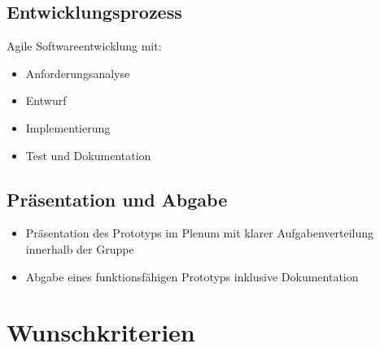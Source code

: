 \documentclass[%
	ngerman,
	12pt,
	a4paper,
	oneside
]{scrbook}
\begin{document}
	\subsection{Entwicklungsprozess}
	Agile Softwareentwicklung mit:
	\begin{itemize}
		\item Anforderungsanalyse
		\item Entwurf
		\item Implementierung
		\item Test und Dokumentation
	\end{itemize}
	\subsection{Präsentation und Abgabe}
	\begin{itemize}
		\item Präsentation des Prototyps im Plenum mit klarer Aufgabenverteilung innerhalb der Gruppe
		\item Abgabe eines funktionsfähigen Prototyps inklusive Dokumentation
	\end{itemize}

\section{Wunschkriterien}
\end{document}
